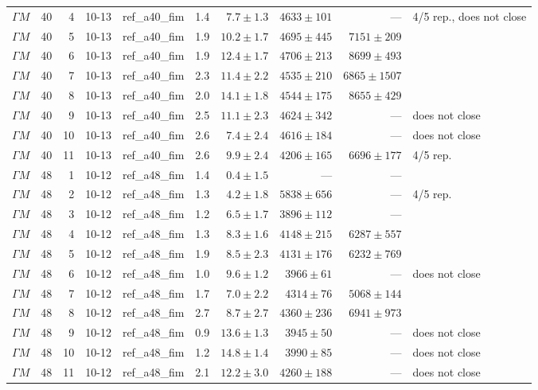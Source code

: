 \documentclass[9pt,a4paper,twocolumn]{extarticle}
\begin{document}
\begin{table}[h]
\begin{tabular}{llrlcrrrrl}
$\Gamma M$ & 40 & 4 & 10-13 & ref\_a40\_fim & 1.4 & $7.7\pm1.3$ & $4633\pm101$ & --- & 4/5 rep., does not close \\
$\Gamma M$ & 40 & 5 & 10-13 & ref\_a40\_fim & 1.9 & $10.2\pm1.7$ & $4695\pm445$ & $7151\pm209$ &  \\
$\Gamma M$ & 40 & 6 & 10-13 & ref\_a40\_fim & 1.9 & $12.4\pm1.7$ & $4706\pm213$ & $8699\pm493$ &  \\
$\Gamma M$ & 40 & 7 & 10-13 & ref\_a40\_fim & 2.3 & $11.4\pm2.2$ & $4535\pm210$ & $6865\pm1507$ &  \\
$\Gamma M$ & 40 & 8 & 10-13 & ref\_a40\_fim & 2.0 & $14.1\pm1.8$ & $4544\pm175$ & $8655\pm429$ &  \\
$\Gamma M$ & 40 & 9 & 10-13 & ref\_a40\_fim & 2.5 & $11.1\pm2.3$ & $4624\pm342$ & --- & does not close \\
$\Gamma M$ & 40 & 10 & 10-13 & ref\_a40\_fim & 2.6 & $7.4\pm2.4$ & $4616\pm184$ & --- & does not close \\
$\Gamma M$ & 40 & 11 & 10-13 & ref\_a40\_fim & 2.6 & $9.9\pm2.4$ & $4206\pm165$ & $6696\pm177$ & 4/5 rep. \\
\midrule
$\Gamma M$ & 48 & 1 & 10-12 & ref\_a48\_fim & 1.4 & $0.4\pm1.5$ & --- & --- &  \\
$\Gamma M$ & 48 & 2 & 10-12 & ref\_a48\_fim & 1.3 & $4.2\pm1.8$ & $5838\pm656$ & --- & 4/5 rep. \\
$\Gamma M$ & 48 & 3 & 10-12 & ref\_a48\_fim & 1.2 & $6.5\pm1.7$ & $3896\pm112$ & --- &  \\
$\Gamma M$ & 48 & 4 & 10-12 & ref\_a48\_fim & 1.3 & $8.3\pm1.6$ & $4148\pm215$ & $6287\pm557$ &  \\
$\Gamma M$ & 48 & 5 & 10-12 & ref\_a48\_fim & 1.9 & $8.5\pm2.3$ & $4131\pm176$ & $6232\pm769$ &  \\
$\Gamma M$ & 48 & 6 & 10-12 & ref\_a48\_fim & 1.0 & $9.6\pm1.2$ & $3966\pm61$ & --- & does not close \\
$\Gamma M$ & 48 & 7 & 10-12 & ref\_a48\_fim & 1.7 & $7.0\pm2.2$ & $4314\pm76$ & $5068\pm144$ &  \\
$\Gamma M$ & 48 & 8 & 10-12 & ref\_a48\_fim & 2.7 & $8.7\pm2.7$ & $4360\pm236$ & $6941\pm973$ &  \\
$\Gamma M$ & 48 & 9 & 10-12 & ref\_a48\_fim & 0.9 & $13.6\pm1.3$ & $3945\pm50$ & --- & does not close \\
$\Gamma M$ & 48 & 10 & 10-12 & ref\_a48\_fim & 1.2 & $14.8\pm1.4$ & $3990\pm85$ & --- & does not close \\
$\Gamma M$ & 48 & 11 & 10-12 & ref\_a48\_fim & 2.1 & $12.2\pm3.0$ & $4260\pm188$ & --- & does not close \\
\bottomrule
\end{tabular}
\end{table}
\end{document}
